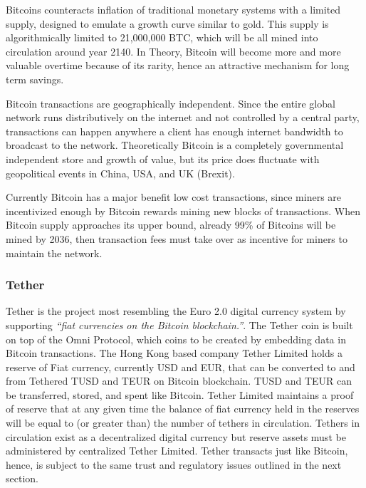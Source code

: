 \documentclass[a4paper,12pt]{article} %
\begin{document}
Bitcoins counteracts inflation of traditional monetary systems with a limited supply, designed to emulate a growth curve similar to gold. This supply is algorithmically limited to 21,000,000 BTC, which will be all mined into circulation around year 2140. In Theory, Bitcoin will become more and more valuable overtime because of its rarity, hence an attractive mechanism for long term savings.

Bitcoin transactions are geographically independent. Since the entire global network runs distributively on the internet and not controlled by a central party, transactions can happen anywhere a client has enough internet bandwidth to broadcast to the network. Theoretically  Bitcoin is a completely governmental independent store and growth of value, but its price does fluctuate with geopolitical events in China, USA, and UK (Brexit).

Currently Bitcoin has a major benefit low cost transactions, since miners are incentivized enough by Bitcoin rewards mining new blocks of transactions. When Bitcoin supply approaches its upper bound, already 99\% of Bitcoins will be mined by 2036, then transaction fees must take over as incentive for miners to maintain the network.

\subsubsection{Tether} \label{sssec:2:tether}

Tether is the project most resembling the Euro 2.0 digital currency system by supporting \textit{``fiat currencies on the Bitcoin blockchain.''}\cite{tether}. The Tether coin is built on top of the Omni Protocol, which coins to be created by embedding data in Bitcoin transactions\cite{omniProtocolSpec}. The Hong Kong based company Tether Limited holds a reserve of Fiat currency, currently USD and EUR, that can be converted to and from Tethered TUSD and TEUR on Bitcoin blockchain. TUSD and TEUR can be transferred, stored, and spent like Bitcoin. Tether Limited maintains a proof of reserve that at any given time the balance of fiat currency held in the reserves will be equal to (or greater than) the number of tethers in circulation. Tethers in circulation exist as a decentralized digital currency but reserve assets must be administered by centralized Tether Limited. Tether transacts just like Bitcoin, hence, is subject to the same trust and regulatory issues outlined in the next section.
\end{document}
